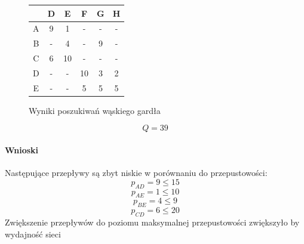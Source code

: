 \begin{figure}[htb]
\caption{Wyniki poszukiwań wąskiego gardła}
\begin{center}
\begin{tabular}{ | c | c | c | c | c | c | }
\hline
  & D & E & F & G & H \\ 
 \hline
 A & 9 & 1 & - & - & -\\  
 \hline
 B & - & 4 & - & 9 & - \\
 \hline  
 C & 6 & 10 & - & - & - \\
 \hline  
 D & - & - & 10 & 3 & 2 \\
 \hline  
 E & - & - & 5 & 5 & 5 \\
 \hline  
\end{tabular}
\end{center}
\end{figure}

\[ Q = 39 \]



\paragraph{Wnioski}
Następujące przepływy są zbyt niskie w porównaniu do przepustowości:
\[ p_{AD} = 9 \le 15  \]
\[ p_{AE} = 1 \le 10  \]
\[ p_{BE} = 4 \le 9  \]
\[ p_{CD} = 6 \le 20  \]
Zwiększenie przepływów do poziomu maksymalnej przepustowości zwiększyło by wydajność sieci



